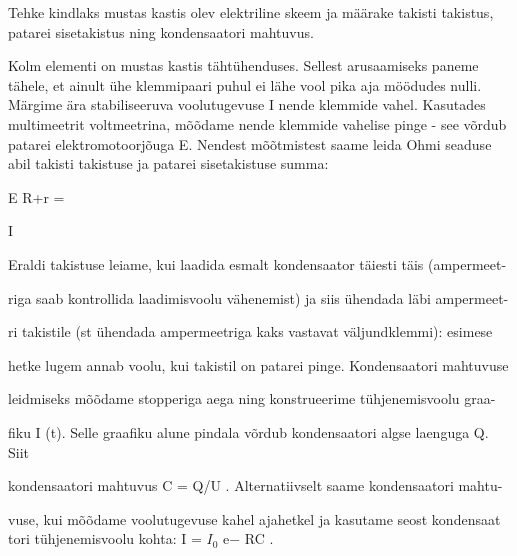 
Tehke kindlaks mustas kastis olev elektriline skeem ja määrake takisti takistus, patarei sisetakistus ning kondensaatori mahtuvus.

\hint

\solu
Kolm elementi on mustas kastis tähtühenduses. Sellest arusaamiseks paneme tähele, et ainult ühe klemmipaari puhul ei lähe vool pika aja möödudes nulli. Märgime ära stabiliseeruva voolutugevuse I nende klemmide vahel. Kasutades multimeetrit voltmeetrina, mõõdame nende klemmide vahelise pinge - see võrdub patarei elektromotoorjõuga E. Nendest mõõtmistest saame leida Ohmi seaduse abil takisti takistuse ja patarei sisetakistuse summa:

E R+r =

I

Eraldi takistuse leiame, kui laadida esmalt kondensaator täiesti täis (ampermeet-

riga saab kontrollida laadimisvoolu vähenemist) ja siis ühendada läbi ampermeet-

ri takistile (st ühendada ampermeetriga kaks vastavat väljundklemmi): esimese

hetke lugem annab voolu, kui takistil on patarei pinge. Kondensaatori mahtuvuse

leidmiseks mõõdame stopperiga aega ning konstrueerime tühjenemisvoolu graa-

fiku I (t). Selle graafiku alune pindala võrdub kondensaatori algse laenguga Q. Siit

kondensaatori mahtuvus C = Q/U . Alternatiivselt saame kondensaatori mahtu-

vuse, kui mõõdame voolutugevuse kahel ajahetkel ja kasutame seost kondensaat tori tühjenemisvoolu kohta: I = $I_0$ e$-$ RC .
\probend
